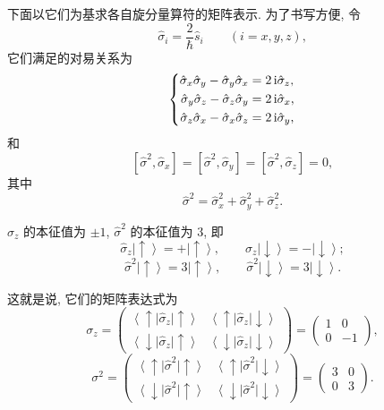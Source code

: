 下面以它们为基求各自旋分量算符的矩阵表示. 为了书写方便, 令
\[
\hat{\sigma}_i=\frac{2}{\hbar}\hat{s}_i
\qquad (i=x, y, z),
\]
它们满足的对易关系为
\[
\left\{
\begin{aligned}
\hat{\sigma}_x\hat{\sigma}_y-\hat{\sigma}_y\hat{\sigma}_x
&=2\mathop{}\!\mathrm{i}\hat{\sigma}_z, \\
\hat{\sigma}_y\hat{\sigma}_z-\hat{\sigma}_z\hat{\sigma}_y
&=2\mathop{}\!\mathrm{i}\hat{\sigma}_x, \\
\hat{\sigma}_z\hat{\sigma}_x-\hat{\sigma}_x\hat{\sigma}_z
&=2\mathop{}\!\mathrm{i}\hat{\sigma}_y,
\end{aligned}
\right.
\]
和
\[
[\hat{\sigma}^2, \hat{\sigma}_x]
=
[\hat{\sigma}^2, \hat{\sigma}_y]
=
[\hat{\sigma}^2, \hat{\sigma}_z]
=0,
\]
其中
\[
\hat{\sigma}^2
=
\hat{\sigma}_x^2+\hat{\sigma}_y^2+\hat{\sigma}_z^2 .
\]

$\hat{\sigma}_z$ 的本征值为 $\pm 1$, $\hat{\sigma}^2$ 的本征值为 $3$, 即
\[
\hat{\sigma}_z\left|\uparrow\right\rangle
=
+\left|\uparrow\right\rangle,
\qquad
\hat{\sigma}_z\left|\downarrow\right\rangle
=
-\left|\downarrow\right\rangle ;
\]
\[
\hat{\sigma}^2\left|\uparrow\right\rangle
=
3\left|\uparrow\right\rangle,
\qquad
\hat{\sigma}^2\left|\downarrow\right\rangle
=
3\left|\downarrow\right\rangle .
\]

这就是说, 它们的矩阵表达式为
\[
\sigma_z
=
\begin{pmatrix}
\left\langle\uparrow\right|\hat{\sigma}_z\left|\uparrow\right\rangle
&
\left\langle\uparrow\right|\hat{\sigma}_z\left|\downarrow\right\rangle
\\
\left\langle\downarrow\right|\hat{\sigma}_z\left|\uparrow\right\rangle
&
\left\langle\downarrow\right|\hat{\sigma}_z\left|\downarrow\right\rangle
\end{pmatrix}
=
\begin{pmatrix}
1 & 0\\
0 & -1
\end{pmatrix},
\]
\[
\sigma^2
=
\begin{pmatrix}
\left\langle\uparrow\right|\hat{\sigma}^2\left|\uparrow\right\rangle
&
\left\langle\uparrow\right|\hat{\sigma}^2\left|\downarrow\right\rangle
\\
\left\langle\downarrow\right|\hat{\sigma}^2\left|\uparrow\right\rangle
&
\left\langle\downarrow\right|\hat{\sigma}^2\left|\downarrow\right\rangle
\end{pmatrix}
=
\begin{pmatrix}
3 & 0\\
0 & 3
\end{pmatrix}.
\]

